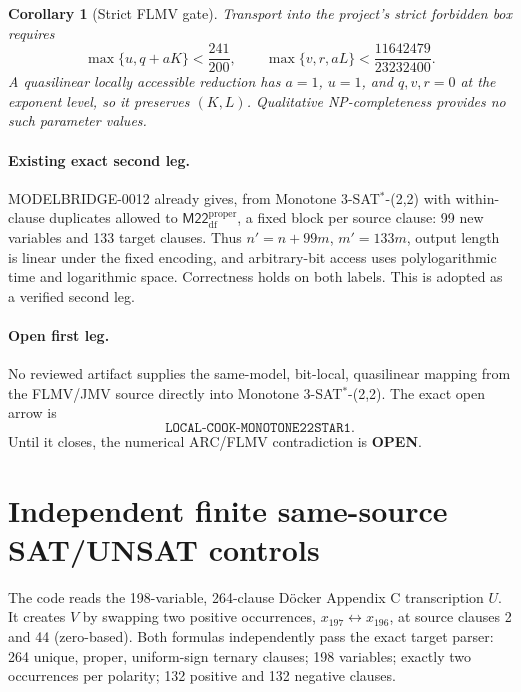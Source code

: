 \documentclass[11pt]{article}
\newtheorem{corollary}{Corollary}
\newcommand{\M}{\mathsf{M22}^{\mathrm{proper}}_{\mathrm{df}}}
\newcommand{\OPEN}{\textbf{OPEN}}
\begin{document}
\begin{corollary}[Strict FLMV gate]
Transport into the project's strict forbidden box requires
\[
\max\{u,q+aK\}<\frac{241}{200},\qquad
\max\{v,r,aL\}<\frac{11642479}{23232400}.
\]
A quasilinear locally accessible reduction has $a=1$, $u=1$, and $q,v,r=0$ at the
exponent level, so it preserves $(K,L)$.  Qualitative NP-completeness provides no such
parameter values.
\end{corollary}

\paragraph{Existing exact second leg.}
MODELBRIDGE-0012 already gives, from Monotone 3-SAT$^*$-(2,2) with within-clause
duplicates allowed to $\M$, a fixed block per source clause: 99 new variables and
133 target clauses.  Thus $n'=n+99m$, $m'=133m$, output length is linear under the
fixed encoding, and arbitrary-bit access uses polylogarithmic time and logarithmic
space.  Correctness holds on both labels.  This is adopted as a verified second leg.

\paragraph{Open first leg.}
No reviewed artifact supplies the same-model, bit-local, quasilinear mapping from the
FLMV/JMV source directly into Monotone 3-SAT$^*$-(2,2).  The exact open arrow is
\[
\texttt{LOCAL-COOK-MONOTONE22STAR1}.
\]
Until it closes, the numerical ARC/FLMV contradiction is \OPEN.

\section{Independent finite same-source SAT/UNSAT controls}

The code reads the 198-variable, 264-clause D\"ocker Appendix C transcription $U$.
It creates $V$ by swapping two positive occurrences, $x_{197}\leftrightarrow x_{196}$,
at source clauses 2 and 44 (zero-based).  Both formulas independently pass the exact
target parser: 264 unique, proper, uniform-sign ternary clauses; 198 variables; exactly
two occurrences per polarity; 132 positive and 132 negative clauses.
\end{document}
